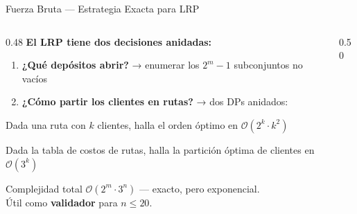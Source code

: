 \documentclass[aspectratio=169,10pt]{beamer}
\begin{document}
\begin{frame}{Fuerza Bruta --- Estrategia Exacta para LRP}
  \begin{columns}[T,onlytextwidth]
    \begin{column}{0.48\textwidth}
      \textbf{El LRP tiene dos decisiones anidadas:}
      \vspace{0.3em}
      \begin{enumerate}\small
        \item \textbf{¿Qué depósitos abrir?}
              → enumerar los $2^m{-}1$ subconjuntos no vacíos
        \item \textbf{¿Cómo partir los clientes en rutas?}
              → dos DPs anidados:
      \end{enumerate}
      \vspace{0.4em}
      \begin{description}\footnotesize
        \item[\textbf{Held-Karp DP}] Dada una ruta con $k$ clientes,
              halla el orden óptimo en $\mathcal{O}(2^k \cdot k^2)$
        \item[\textbf{Set-Cover DP}] Dada la tabla de costos de rutas,
              halla la partición óptima de clientes en $\mathcal{O}(3^k)$
      \end{description}
      \vspace{0.4em}
      \begin{alertblock}{Complejidad total}
        \footnotesize $\mathcal{O}(2^m \cdot 3^n)$ --- exacto, pero exponencial.\\
        Útil como \textbf{validador} para $n \le 20$.
      \end{alertblock}
    \end{column}
    \begin{column}{0.50\textwidth}
      \vspace{0.3em}
      \begin{center}
\end{center}
\end{column}
\end{columns}
\end{frame}
\end{document}
